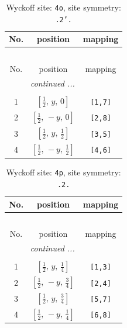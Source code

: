 \documentclass[fleqn,8pt]{jsarticle}
\begin{document}
\renewcommand{\arraystretch}{1.2}
\begin{longtable}{ccc}
\caption{Wyckoff site: {\tt 4o}, site symmetry: {\tt .2'.}}
 \\
 \hline \hline
No. & position & mapping \\ \hline \endfirsthead

\multicolumn{2}{l}{\tablename\ \thetable{}} \\
 \hline \hline
No. & position & mapping \\ \hline \endhead

 \hline \hline
\multicolumn{2}{r}{\footnotesize\it continued ...} \\ \endfoot

 \hline \hline
\multicolumn{2}{r}{} \\ \endlastfoot

1 & $\left[ \frac{1}{2},\, y,\, 0 \right]$ & {\tt [1,7]} \\ \hline
2 & $\left[ \frac{1}{2},\, - y,\, 0 \right]$ & {\tt [2,8]} \\ \hline
3 & $\left[ \frac{1}{2},\, y,\, \frac{1}{2} \right]$ & {\tt [3,5]} \\ \hline
4 & $\left[ \frac{1}{2},\, - y,\, \frac{1}{2} \right]$ & {\tt [4,6]} \\
\end{longtable}
\renewcommand{\arraystretch}{1.2}
\begin{longtable}{ccc}
\caption{Wyckoff site: {\tt 4p}, site symmetry: {\tt .2.}}
 \\
 \hline \hline
No. & position & mapping \\ \hline \endfirsthead

\multicolumn{2}{l}{\tablename\ \thetable{}} \\
 \hline \hline
No. & position & mapping \\ \hline \endhead

 \hline \hline
\multicolumn{2}{r}{\footnotesize\it continued ...} \\ \endfoot

 \hline \hline
\multicolumn{2}{r}{} \\ \endlastfoot

1 & $\left[ \frac{1}{2},\, y,\, \frac{1}{4} \right]$ & {\tt [1,3]} \\ \hline
2 & $\left[ \frac{1}{2},\, - y,\, \frac{3}{4} \right]$ & {\tt [2,4]} \\ \hline
3 & $\left[ \frac{1}{2},\, y,\, \frac{3}{4} \right]$ & {\tt [5,7]} \\ \hline
4 & $\left[ \frac{1}{2},\, - y,\, \frac{1}{4} \right]$ & {\tt [6,8]} \\
\end{longtable}
\end{document}

